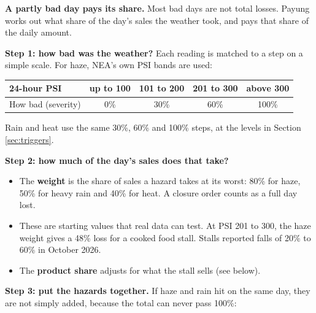 \documentclass[11pt,a4paper]{article}
\newcommand{\head}{\rowcolor{soft}}
\begin{document}
\textbf{A partly bad day pays its share.} Most bad days are not total losses. Payung works out what share of the day's sales the weather took, and pays that share of the daily amount.

\textbf{Step 1: how bad was the weather?} Each reading is matched to a step on a simple scale. For haze, NEA's own PSI bands are used:

\begin{center}
\small
\begin{tabular}{|l|c|c|c|c|}
\hline
\head \textbf{24-hour PSI} & \textbf{up to 100} & \textbf{101 to 200} & \textbf{201 to 300} & \textbf{above 300} \\
\hline
How bad (severity) & 0\% & 30\% & 60\% & 100\% \\
\hline
\end{tabular}
\end{center}

Rain and heat use the same 30\%, 60\% and 100\% steps, at the levels in Section \ref{sec:triggers}.

\textbf{Step 2: how much of the day's sales does that take?}
\begin{center}
\end{center}
\begin{itemize}[leftmargin=1.2em]
  \item The \textbf{weight} is the share of sales a hazard takes at its worst: 80\% for haze, 50\% for heavy rain and 40\% for heat. A closure order counts as a full day lost.
  \item These are starting values that real data can test. At PSI 201 to 300, the haze weight gives a 48\% loss for a cooked food stall. Stalls reported falls of 20\% to 60\% in October 2026.\cite{st-haze}
  \item The \textbf{product share} adjusts for what the stall sells (see below).
\end{itemize}

\textbf{Step 3: put the hazards together.} If haze and rain hit on the same day, they are not simply added, because the total can never pass 100\%:
\begin{center}
\end{center}
\end{document}
